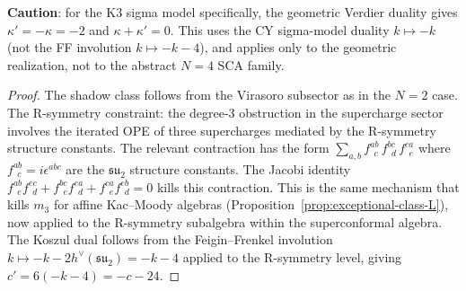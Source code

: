 \begin{proposition}[Small $N{=}4$ SCA shadow data;
 \ClaimStatusProvedHere]
\begin{enumerate}[label=\textup{(\roman*)},nosep]
 \textbf{Caution}: for the K3 sigma model specifically,
 the geometric Verdier duality gives $\kappa' = -\kappa = -2$
 and $\kappa + \kappa' = 0$. This uses the CY sigma-model
 duality $k \mapsto -k$ \textup{(}not the FF involution
 $k \mapsto -k - 4$\textup{)}, and applies only to the
 geometric realization, not to the abstract $N{=}4$ SCA family.
\end{enumerate}
\end{proposition}

\begin{proof}
The shadow class follows from the Virasoro subsector as in the
$N{=}2$ case. The R-symmetry constraint: the degree-$3$
obstruction in the supercharge sector involves the iterated OPE
of three supercharges mediated by the R-symmetry structure
constants. The relevant contraction has the form
$\sum_{a,b} f^{ab}_{\ \ c}\, f^{bc}_{\ \ d}\, f^{ca}_{\ \ e}$
where $f^{ab}_{\ \ c} = i\epsilon^{abc}$ are the
$\mathfrak{su}_2$ structure constants. The Jacobi identity
$f^{ab}_{\ \ e} f^{ec}_{\ \ d} + f^{bc}_{\ \ e} f^{ea}_{\ \ d}
+ f^{ca}_{\ \ e} f^{eb}_{\ \ d} = 0$ kills this contraction.
This is the same mechanism that kills $m_3$ for affine
Kac--Moody algebras
(Proposition~\ref{prop:exceptional-class-L}), now applied to the
R-symmetry subalgebra within the superconformal algebra. The
Koszul dual follows from the Feigin--Frenkel involution
$k \mapsto -k - 2h^\vee(\mathfrak{su}_2) = -k - 4$ applied
to the R-symmetry level, giving $c' = 6(-k-4) = -c - 24$.
\end{proof}

